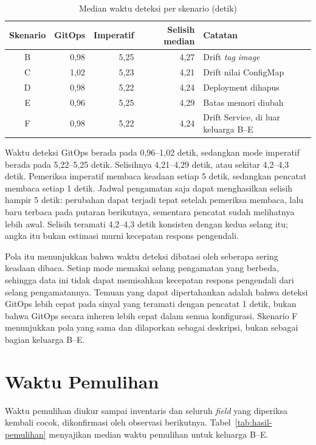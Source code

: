 \begin{table}[H]
  \centering
  \small
  \caption{Median waktu deteksi per skenario (detik)}
  \label{tab:hasil-deteksi}
  \begin{tabularx}{\textwidth}{|c|r|r|r|>{\raggedright\arraybackslash}X|}
    \hline
    Skenario & GitOps & Imperatif & Selisih median & Catatan \\
    \hline
    B & 0,98 & 5,25 & 4,27 & Drift \textit{tag} \textit{image} \\
    \hline
    C & 1,02 & 5,23 & 4,21 & Drift nilai ConfigMap \\
    \hline
    D & 0,98 & 5,22 & 4,24 & Deployment dihapus \\
    \hline
    E & 0,96 & 5,25 & 4,29 & Batas memori diubah \\
    \hline
    F & 0,98 & 5,22 & 4,24 & Drift Service, di luar keluarga B--E \\
    \hline
  \end{tabularx}
\end{table}

Waktu deteksi GitOps berada pada 0,96--1,02 detik, sedangkan mode imperatif berada pada 5,22--5,25 detik. Selisihnya 4,21--4,29 detik, atau sekitar 4,2--4,3 detik. Pemeriksa imperatif membaca keadaan setiap 5 detik, sedangkan pencatat membaca setiap 1 detik. Jadwal pengamatan saja dapat menghasilkan selisih hampir 5 detik: perubahan dapat terjadi tepat setelah pemeriksa membaca, lalu baru terbaca pada putaran berikutnya, sementara pencatat sudah melihatnya lebih awal. Selisih teramati 4,2--4,3 detik konsisten dengan kedua selang itu; angka itu bukan estimasi murni kecepatan respons pengendali.

Pola itu menunjukkan bahwa waktu deteksi dibatasi oleh seberapa sering keadaan dibaca. Setiap mode memakai selang pengamatan yang berbeda, sehingga data ini tidak dapat memisahkan kecepatan respons pengendali dari selang pengamatannya. Temuan yang dapat dipertahankan adalah bahwa deteksi GitOps lebih cepat pada sinyal yang teramati dengan pencatat 1 detik, bukan bahwa GitOps secara inheren lebih cepat dalam semua konfigurasi. Skenario F menunjukkan pola yang sama dan dilaporkan sebagai deskripsi, bukan sebagai bagian keluarga B--E.

\section{Waktu Pemulihan}
\label{sec:waktu-pemulihan}

Waktu pemulihan diukur sampai inventaris dan seluruh \textit{field} yang diperiksa kembali cocok, dikonfirmasi oleh observasi berikutnya. Tabel~\ref{tab:hasil-pemulihan} menyajikan median waktu pemulihan untuk keluarga B--E.

